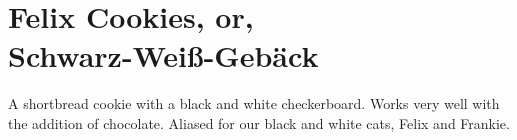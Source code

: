 \section[Felix Cookies]{
    Felix Cookies, or,\\ \mbox{Schwarz-Wei\ss-Geb\"{a}ck}
}

\begin{recipestats}[
        servings=40 cookies,
        preptime=30 \minute~(+chill),
        bakingtime=12 \minute,
        source=\citetitle{luisaWeiss2016}~\cite{luisaWeiss2016},
    ]
\end{recipestats}

\begin{recipeabstract}
    A shortbread cookie with a black and white checkerboard.
    Works very well with the addition of chocolate.
    Aliased for our black and white cats, Felix and Frankie.
\end{recipeabstract}

\begin{ingredientcolumns}
    \begin{ingredientblock}
        \\
        \\
        \\
    \end{ingredientblock}
    \begin{ingredientblock}
        \\
        \\
        \\
    \end{ingredientblock}
\end{ingredientcolumns}

